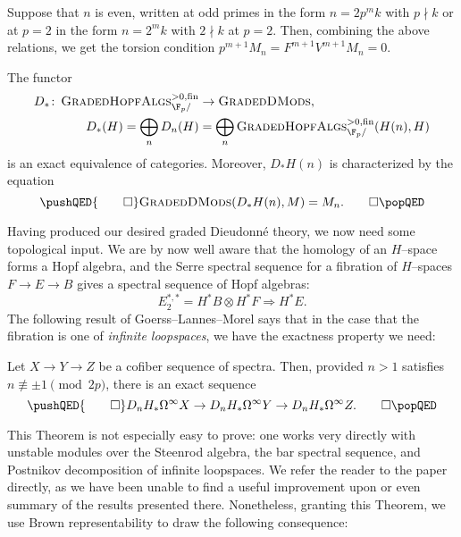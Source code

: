 \begin{remark}
Suppose that \(n\) is even, written at odd primes in the form \(n = 2p^m k\) with \(p \nmid k\) or at \(p = 2\) in the form \(n = 2^m k\) with \(2 \nmid k\) at \(p = 2\).  Then, combining the above relations, we get the torsion condition \(p^{m+1} M_n = F^{m+1} V^{m+1} M_n = 0\).
\end{remark}

\begin{theorem}
The functor
\begin{align*}
D_*\co \CatOf{GradedHopfAlgs}^{>0, \fin}_{\F_p/} & \to \CatOf{GradedDMods}, \\
D_*(H) = \bigoplus_n D_n(H) & = \bigoplus_n \CatOf{GradedHopfAlgs}^{>0, \fin}_{\F_p/}(H(n), H)
\end{align*}
is an exact equivalence of categories.  Moreover, \(D_* H(n)\) is characterized by the equation
\[\pushQED{\qed}
\CatOf{GradedDMods}(D_* H(n), M) = M_n. \qedhere
\popQED\]
\end{theorem}

Having produced our desired graded Dieudonn\'e theory, we now need some topological input.  We are by now well aware that the homology of an \(H\)--space forms a Hopf algebra, and the Serre spectral sequence for a fibration of \(H\)--spaces \(F \to E \to B\) gives a spectral sequence of Hopf algebras: \[E_2^{*, *} = H^* B \otimes H^* F \Rightarrow H^* E.\]  The following result of Goerss--Lannes--Morel says that in the case that the fibration is one of \emph{infinite loopspaces}, we have the exactness property we need:

\begin{theorem}
Let \(X \to Y \to Z\) be a cofiber sequence of spectra.  Then, provided \(n > 1\) satisfies \(n \not\equiv \pm 1 \pmod{2p}\), there is an exact sequence
\[\pushQED{\qed}
D_n H_* \Loops^\infty X \to D_n H_* \Loops^\infty Y \to D_n H_* \Loops^\infty Z. \qedhere
\popQED\]
\end{theorem}

\noindent This Theorem is not especially easy to prove: one works very directly with unstable modules over the Steenrod algebra, the bar spectral sequence, and Postnikov decomposition of infinite loopspaces.  We refer the reader to the paper directly, as we have been unable to find a useful improvement upon or even summary of the results presented there.  Nonetheless, granting this Theorem, we use Brown representability to draw the following consequence:

